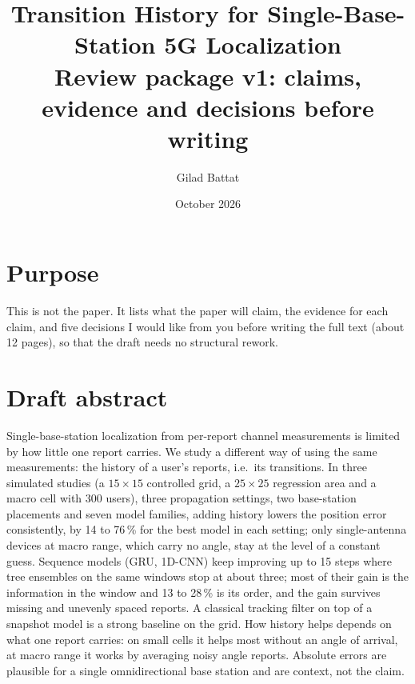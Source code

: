 \documentclass[10pt]{article}
\title{Transition History for Single-Base-Station 5G Localization\\[2pt]\large Review package v1: claims, evidence and decisions before writing}
\author{Gilad Battat}
\date{October 2026}
\begin{document}
\maketitle

\section*{Purpose}
This is not the paper. It lists what the paper will claim, the evidence for each claim, and five decisions I would like from you before writing the full text (about 12 pages), so that the draft needs no structural rework.

\section*{Draft abstract}
Single-base-station localization from per-report channel measurements is limited by how little one report carries. We study a different way of using the same measurements: the history of a user's reports, i.e.\ its transitions. In three simulated studies (a $15\times15$ controlled grid, a $25\times25$ regression area and a macro cell with 300 users), three propagation settings, two base-station placements and seven model families, adding history lowers the position error consistently, by 14 to 76\,\% for the best model in each setting; only single-antenna devices at macro range, which carry no angle, stay at the level of a constant guess. Sequence models (GRU, 1D-CNN) keep improving up to 15 steps where tree ensembles on the same windows stop at about three; most of their gain is the information in the window and 13 to 28\,\% is its order, and the gain survives missing and unevenly spaced reports. A classical tracking filter on top of a snapshot model is a strong baseline on the grid. How history helps depends on what one report carries: on small cells it helps most without an angle of arrival, at macro range it works by averaging noisy angle reports. Absolute errors are plausible for a single omnidirectional base station and are context, not the claim.
\end{document}
